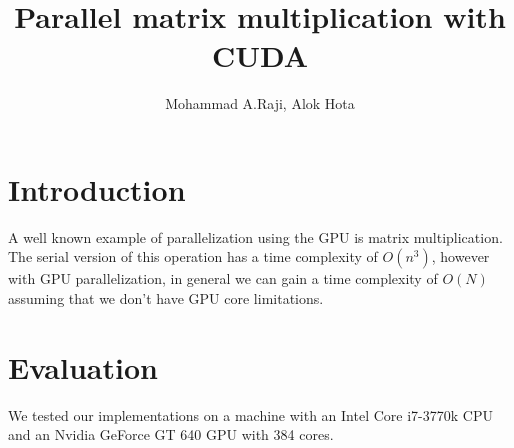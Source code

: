 \documentclass[11pt,a4paper]{article}
\author{Mohammad A.Raji, Alok Hota}
\title{Parallel matrix multiplication with CUDA}
\begin{document}
	\maketitle
	
	\section{Introduction}
A well known example of parallelization using the GPU is matrix multiplication. The serial version of this operation has a time complexity of $O(n^3)$, however with GPU parallelization, in general we can gain a time complexity of $O(N)$ assuming that we don't have GPU core limitations. 
	
	\section{Evaluation}
	We tested our implementations on a machine with an Intel Core i7-3770k CPU and an Nvidia GeForce GT 640 GPU with 384 cores. 
	
\end{document}
